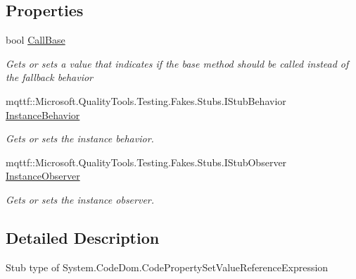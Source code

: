 \subsection*{Properties}
\begin{DoxyCompactItemize}
\item 
bool \hyperlink{class_system_1_1_code_dom_1_1_fakes_1_1_stub_code_property_set_value_reference_expression_af31f3eaefe5425dafbb72b66e7e1d7c2}{Call\-Base}
\begin{DoxyCompactList}\small\item\em Gets or sets a value that indicates if the base method should be called instead of the fallback behavior\end{DoxyCompactList}\item 
mqttf\-::\-Microsoft.\-Quality\-Tools.\-Testing.\-Fakes.\-Stubs.\-I\-Stub\-Behavior \hyperlink{class_system_1_1_code_dom_1_1_fakes_1_1_stub_code_property_set_value_reference_expression_a94da1f4ac2c5170bbd723ab637617326}{Instance\-Behavior}
\begin{DoxyCompactList}\small\item\em Gets or sets the instance behavior.\end{DoxyCompactList}\item 
mqttf\-::\-Microsoft.\-Quality\-Tools.\-Testing.\-Fakes.\-Stubs.\-I\-Stub\-Observer \hyperlink{class_system_1_1_code_dom_1_1_fakes_1_1_stub_code_property_set_value_reference_expression_af962e86438df8132ff19a5bb0e7709e5}{Instance\-Observer}
\begin{DoxyCompactList}\small\item\em Gets or sets the instance observer.\end{DoxyCompactList}\end{DoxyCompactItemize}


\subsection{Detailed Description}
Stub type of System.\-Code\-Dom.\-Code\-Property\-Set\-Value\-Reference\-Expression



